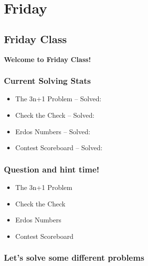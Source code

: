 \documentclass{beamer}
\begin{document}
\section{Friday}
\subsection{Friday Class}
\begin{frame}
  \begin{center}
  {\bf Welcome to Friday Class!}
  \end{center}
\end{frame}

\begin{frame}
  \frametitle{Current Solving Stats}
  \begin{itemize}
  \item The 3n+1 Problem -- Solved:
  \item Check the Check -- Solved:
  \item Erdos Numbers -- Solved:
  \item Contest Scoreboard -- Solved:
  \end{itemize}
\end{frame}

\begin{frame}
  \frametitle{Question and hint time!}
  \begin{itemize}
  \item<1> The 3n+1 Problem
  \item<2> Check the Check
  \item<3> Erdos Numbers
  \item<4> Contest Scoreboard
  \end{itemize}
\end{frame}

\begin{frame}
  \frametitle{Let's solve some different problems}

\end{frame}
\end{document}
